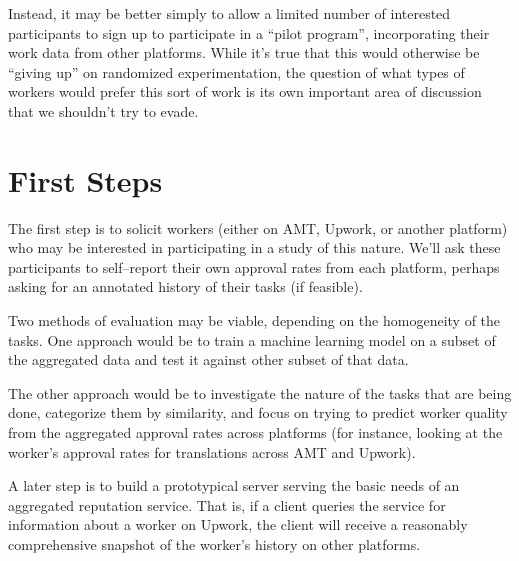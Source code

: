 \documentclass[11pt]{article}
\begin{document}
Instead, it may be better simply to allow
a limited number of interested participants
to sign up to participate in a ``pilot program'',
incorporating their work data from other platforms.
While it's true that this would otherwise be ``giving up'' on randomized experimentation,
the question of
what types of workers would prefer this sort of work is
its own important area of discussion that we shouldn't try to evade.

\section*{First Steps}
The first step is to solicit workers
(either on AMT, Upwork, or another platform)
who may be interested in participating in a study of this nature.
We'll ask these participants to self--report their own approval rates from each platform,
perhaps asking for an annotated history of their tasks
(if feasible).

Two methods of evaluation may be viable, depending on the homogeneity of the tasks.
One approach would be
to train a machine learning model on a subset of the aggregated data
and test it against other subset of that data.

The other approach would be
to investigate the nature of the tasks that are being done,
categorize them by similarity, and
focus on trying to predict worker quality from the aggregated approval rates across platforms
(for instance, looking at the worker's approval rates for translations across AMT and Upwork).





A later step is
to build a prototypical server serving the basic needs of
an aggregated reputation service.
That is,
if a client queries the service for information about a worker on Upwork,
the client will receive a reasonably comprehensive snapshot of the worker's
history on other platforms.

\end{document}
